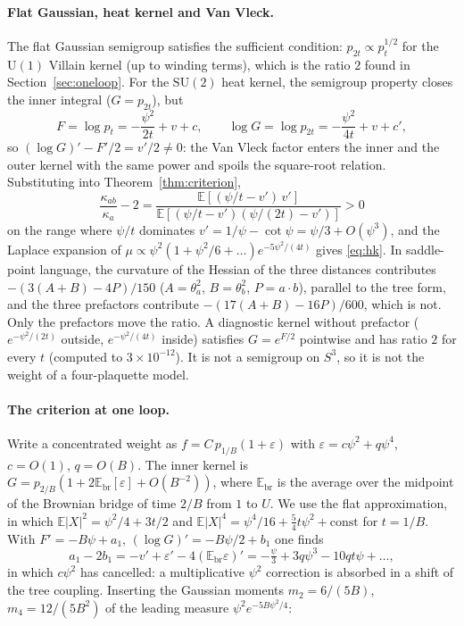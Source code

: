 \documentclass[11pt,a4paper]{article}
\theoremstyle{definition}
\theoremstyle{remark}
\newcommand{\E}{\mathbb{E}}
\newcommand{\SU}{\mathrm{SU}(2)}
\begin{document}
\paragraph{Flat Gaussian, heat kernel and Van Vleck.}
The flat Gaussian semigroup satisfies the sufficient condition: $p_{2t}\propto p_t^{1/2}$ for the $\mathrm{U}(1)$ Villain kernel (up to winding terms), which is the ratio $2$ found in Section~\ref{sec:oneloop}.
For the $\SU$ heat kernel, the semigroup property closes the inner integral ($G=p_{2t}$), but
\[
F=\log p_t=-\frac{\psi^2}{2t}+v+c,\qquad \log G=\log p_{2t}=-\frac{\psi^2}{4t}+v+c',
\]
so $(\log G)'-F'/2=v'/2\ne0$: the Van Vleck factor enters the inner and the outer kernel with the same power and spoils the square-root relation.
Substituting into Theorem~\ref{thm:criterion},
\[
\frac{\kappa_{ab}}{\kappa_a}-2=\frac{\E[(\psi/t-v')\,v']}{\E[(\psi/t-v')(\psi/(2t)-v')]}>0
\]
on the range where $\psi/t$ dominates $v'=1/\psi-\cot\psi=\psi/3+O(\psi^3)$, and the Laplace expansion of $\mu\propto\psi^2(1+\psi^2/6+\dots)e^{-5\psi^2/(4t)}$ gives \eqref{eq:hk}.
In saddle-point language, the curvature of the Hessian of the three distances contributes $-(3(A+B)-4P)/150$ ($A=\theta_a^2$, $B=\theta_b^2$, $P=a\cdot b$), parallel to the tree form, and the three prefactors contribute $-(17(A+B)-16P)/600$, which is not.
Only the prefactors move the ratio.
A diagnostic kernel without prefactor ($e^{-\psi^2/(2t)}$ outside, $e^{-\psi^2/(4t)}$ inside) satisfies $G=e^{F/2}$ pointwise and has ratio $2$ for every $t$ (computed to $3\times10^{-12}$).
It is not a semigroup on $S^3$, so it is not the weight of a four-plaquette model.

\paragraph{The criterion at one loop.}
Write a concentrated weight as $f=C\,p_{1/B}(1+\varepsilon)$ with $\varepsilon=c\psi^2+q\psi^4$, $c=O(1)$, $q=O(B)$.
The inner kernel is $G=p_{2/B}(1+2\E_{\mathrm{br}}[\varepsilon]+O(B^{-2}))$, where $\E_{\mathrm{br}}$ is the average over the midpoint of the Brownian bridge of time $2/B$ from $1$ to $U$.
We use the flat approximation, in which $\E|X|^2=\psi^2/4+3t/2$ and $\E|X|^4=\psi^4/16+\tfrac54t\psi^2+\mathrm{const}$ for $t=1/B$.
With $F'=-B\psi+a_1$, $(\log G)'=-B\psi/2+b_1$ one finds
\[
a_1-2b_1=-v'+\varepsilon'-4(\E_{\mathrm{br}}\varepsilon)'=-\tfrac{\psi}{3}+3q\psi^3-10qt\psi+\dots,
\]
in which $c\psi^2$ has cancelled: a multiplicative $\psi^2$ correction is absorbed in a shift of the tree coupling.
Inserting the Gaussian moments $m_2=6/(5B)$, $m_4=12/(5B^2)$ of the leading measure $\psi^2e^{-5B\psi^2/4}$:
\end{document}
